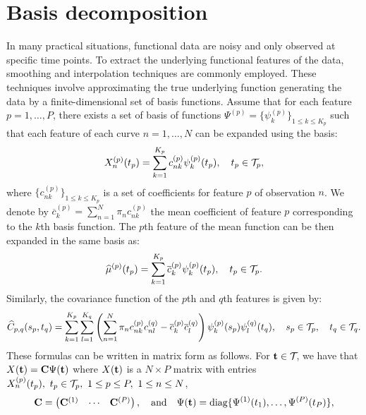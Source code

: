 
\section{Basis decomposition} %
\label{sub:basis_decomposition}


In many practical situations, functional data are noisy and only observed at specific time points. To extract the underlying functional features of the data, smoothing and interpolation techniques are commonly employed. These techniques involve approximating the true underlying function generating the data by a finite-dimensional set of basis functions. Assume that for each feature $p = 1, \dots, P$, there exists a set of basis of functions $\Psi^{(p)} = \{\psi_k^{(p)}\}_{1 \leq k \leq K_p}$ such that each feature of each curve $n = 1, \dots, N$ can be expanded using the basis:
\begin{equation}\label{eq:curve_basis_expansion}
X_n^{(p)}(t_p) = \sum_{k = 1}^{K_p} c^{(p)}_{nk}\psi_k^{(p)}(t_p), \quad t_p \in \mathcal{T}_{p},
\end{equation}
where $\{c^{(p)}_{nk}\}_{1 \leq k \leq K_p}$ is a set of coefficients for feature $p$ of observation $n$. We denote by $\overline{c}_k^{(p)} = \sum_{n = 1}^N \pi_n c^{(p)}_{nk}$ the mean coefficient of feature $p$ corresponding to the $k$th basis function.
The $p$th feature of the mean function can be then expanded in the same basis as:
\begin{equation}
    \widehat{\mu}^{(p)}(t_p) = \sum_{k = 1}^{K_p} \overline{c}_k^{(p)}\psi_k^{(p)}(t_p), \quad t_p \in \mathcal{T}_{p}.
\end{equation}
Similarly, the covariance function of the $p$th and $q$th features is given by:
\begin{equation}
    \widehat{C}_{p,q}(s_p, t_q) = \sum_{k = 1}^{K_p} \sum_{l = 1}^{K_q} \left(\sum_{n = 1}^N \pi_n c^{(p)}_{nk}c^{(q)}_{nl} - \overline{c}_k^{(p)}\overline{c}_l^{(q)}\right)\psi_k^{(p)}(s_p)\psi_l^{(q)}(t_q), \quad s_p \in \mathcal{T}_{p},\quad t_q \in \mathcal{T}_{q}.
\end{equation}
These formulas can be written in matrix form as follows. For $\mathbf{t} \in \mathcal{T}_{}$, we have that $X(\mathbf{t}) = \mathbf{C}\Psi(\mathbf{t})$ where $X(\mathbf{t})$ is a $N \times P$ matrix with entries $X_n^{(p)}(t_p),~t_p \in \mathcal{T}_{p},~1 \leq p \leq P,~1 \leq n \leq N$,
\begin{equation}
    \mathbf{C} = \begin{pmatrix}
            \mathbf{C}^{(1)} & \cdots & \mathbf{C}^{(P)} \\
        \end{pmatrix}, \quad \text{and}\quad
    \Psi(\mathbf{t}) = \text{diag}\{\Psi^{(1)}(t_1), \dots, \Psi^{(P)}(t_P)\},
\end{equation}
